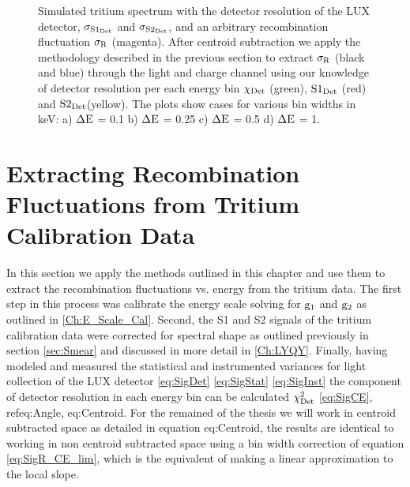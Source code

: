 \begin{figure}[h!]
\caption{Simulated tritium spectrum with the detector resolution of the LUX detector, $\rm \sigma_{S1_{Det}}$ and $\rm \sigma_{S2_{Det}}$, and an arbitrary recombination fluctuation $\rm \sigma_R$ (magenta). After centroid subtraction we apply the methodology described in the previous section to extract $\rm \sigma_R$ (black and blue) through the light and charge channel using our knowledge of detector resolution per each energy bin $\rm \chi_{Det}$ (green), $\rm S1_{Det}$ (red) and $\rm S2_{Det} $(yellow). The plots show cases for various bin widths in keV: a) $\rm \Delta E$ = 0.1 b) $\rm \Delta E$ = 0.25 c) $\rm \Delta E$ = 0.5 d) $\rm \Delta E$ = 1.   }
\label{fig:T_Var}
\end{figure}%


\newpage


\section{Extracting Recombination Fluctuations from Tritium Calibration Data}
\label{sec:Recomb_Data}

In this section we apply the methods outlined in this chapter and use them to extract the recombination fluctuations vs. energy from the tritium data. The first step in this process was calibrate the energy scale solving for $\rm g_1$ and $\rm g_2$ as outlined in \ref{Ch:E_Scale_Cal}. Second, the S1 and S2 signals of the tritium calibration data were corrected for spectral shape as outlined previously in section \ref{sec:Smear} and discussed in more detail in \ref{Ch:LYQY}. Finally, having modeled and measured the statistical and instrumented variances for light collection of the LUX detector \ref{eq:SigDet} \ref{eq:SigStat} \ref{eq:SigInst} the component of detector resolution in each energy bin can be calculated $\rm \chi_{Det}^2$ \ref{eq:SigCE}, ref{eq:Angle}, {eq:Centroid}. For the remained of the thesis we will work in centroid subtracted space as detailed in equation {eq:Centroid}, the results are identical to working in non centroid subtracted space using a bin width correction of equation \ref{eq:SigR_CE_lim}, which is the equivalent of making a linear approximation to the local slope.  


